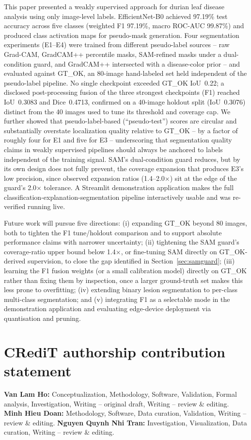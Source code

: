 \documentclass[final,5p,times,twocolumn,authoryear]{elsarticle}
\begin{document}
This paper presented a weakly supervised approach for durian leaf disease analysis using only image-level labels. EfficientNet-B0 achieved 97.19\% test accuracy across five classes (weighted F1 97.19\%, macro ROC-AUC 99.87\%) and produced class activation maps for pseudo-mask generation. Four segmentation experiments (E1--E4) were trained from different pseudo-label sources -- raw Grad-CAM, GradCAM++ percentile masks, SAM-refined masks under a dual-condition guard, and GradCAM++ intersected with a disease-color prior -- and evaluated against GT\_OK, an 80-image hand-labeled set held independent of the pseudo-label pipeline. No single checkpoint exceeded GT\_OK IoU~0.22; a disclosed post-processing fusion of the three strongest checkpoints (F1) reached IoU~0.3083 and Dice~0.4713, confirmed on a 40-image holdout split (IoU~0.3076) distinct from the 40 images used to tune its threshold and coverage cap. We further showed that pseudo-label-based (``pseudo-test'') scores are circular and substantially overstate localization quality relative to GT\_OK -- by a factor of roughly four for E1 and five for E3 -- underscoring that segmentation quality claims in weakly supervised pipelines should always be anchored to labels independent of the training signal. SAM's dual-condition guard reduces, but by its own design does not fully prevent, the coverage expansion that produces E3's low precision, since observed expansion ratios (1.4--2.0$\times$) sit at the edge of the guard's 2.0$\times$ tolerance. A Streamlit demonstration application makes the full classification-explanation-segmentation pipeline interactively usable and was re-verified running live.

Future work will pursue five directions: (i) expanding GT\_OK beyond 80 images, both to tighten the F1 tune/holdout comparison and to support absolute performance claims with narrower uncertainty; (ii) tightening the SAM guard's coverage-ratio upper bound below 1.4$\times$, or fine-tuning SAM directly on GT\_OK-derived supervision, to close the gap identified in Section~\ref{sec:samguard}; (iii) learning the F1 fusion weights (or a small calibration model) directly on GT\_OK rather than fixing them by inspection, once a larger ground-truth set makes this less prone to overfitting; (iv) extending binary lesion segmentation to per-class multi-class segmentation; and (v) integrating F1 as a selectable mode in the demonstration application and evaluating edge-device deployment via quantisation and pruning.

\section*{CRediT authorship contribution statement}
\noindent\textbf{Van Lam Ho:} Conceptualization, Methodology, Software, Validation, Formal analysis, Investigation, Writing -- original draft, Writing -- review \& editing. \textbf{Minh Hieu Doan:} Methodology, Software, Data curation, Validation, Writing -- review \& editing. \textbf{Nguyen Quynh Nhi Tran:} Investigation, Visualization, Data curation, Writing -- review \& editing.
\end{document}
